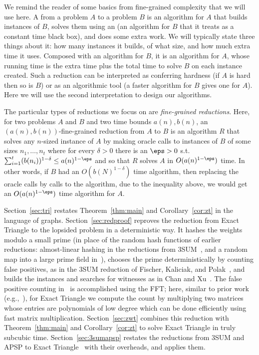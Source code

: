 We remind the reader of some basics from fine-grained complexity that we will use here. 
A  from a problem $A$ to a problem $B$ is an algorithm for $A$ that builds instances of $B$, solves them using an  (an algorithm for $B$ that it treats as a constant time black box), and does some extra work. We will typically state three things about it: how many instances it builds, of what size, and how much extra time it uses. Composed with an algorithm for $B$, it is an algorithm for $A$, whose running time is the extra time plus the total time to solve $B$ on each instance created. Such a reduction can be interpreted as conferring hardness (if $A$ is hard then so is $B$) or as an algorithmic tool (a faster algorithm for $B$ gives one for $A$). Here we will use the second interpretation to design our algorithms.

The particular types of reductions we focus on are {\em fine-grained reductions}. Here, for two problems $A$ and $B$ and two time bounds $a(n),b(n)$, an $(a(n),b(n))$-fine-grained reduction from $A$ to $B$ is an algorithm $R$ that solves any $n$-sized instance of $A$ by making oracle calls to instances of $B$ of some sizes $n_1,\ldots,n_t$ where for every $\delta>0$ there is an $\eps>0$ s.t. $\sum_{i=1}^t (b(n_i))^{1-\delta}\leq a(n)^{1-\eps}$ and so that $R$ solves $A$ in $O(a(n)^{1-\eps})$ time. In other words, if $B$ had an $O(b(N)^{1-\delta})$ time algorithm, then replacing the oracle calls by calls to the algorithm, due to the inequality above, we would get an $O(a(n)^{1-\eps})$ time algorithm for $A$.


Section~\ref{sec:tri} restates Theorem~\ref{thm:main} and Corollary~\ref{cor:zt} in the language of graphs. Section~\ref{sec:redproof} reproves the reduction from Exact Triangle to the lopsided problem in a deterministic way. It hashes the weights modulo a small prime (in place of the random hash functions of earlier reductions: almost-linear hashing in the reductions from $3$SUM~\cite{Pat10,KPP16}, and a random map into a large prime field in~\cite{VX20a}), chooses the prime deterministically by counting false positives, as in the $3$SUM reduction of Fischer, Kaliciak, and Polak~\cite{FKP24}, and builds the instances and searches for witnesses as in Chan and Xu~\cite{CX24}. 
The false positive counting in~\cite{FKP24} is accomplished using the FFT; here, similar to prior work (e.g.,~\cite{AGM97}), for Exact Triangle we compute the count by multiplying two matrices whose entries are polynomials of low degree which can be done efficiently using fast matrix multiplication.
Section~\ref{sec:zwt} combines this reduction with Theorem~\ref{thm:main} and Corollary~\ref{cor:zt} to solve Exact Triangle in truly subcubic time. Section~\ref{sec:3sumapsp} restates the reductions from $3$SUM and APSP to Exact Triangle~\cite{VW13,VW10,VW18,CH20} with their overheads, and applies them.



